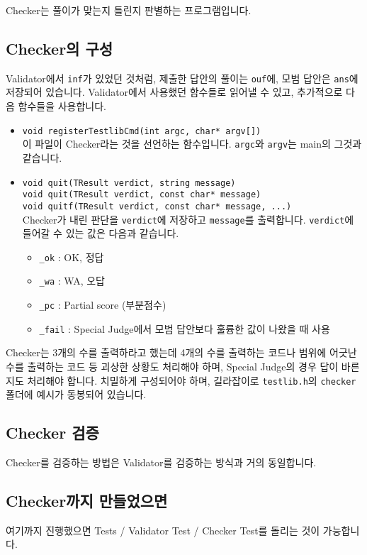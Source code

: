 \documentclass{article}
\begin{document}
    Checker는 풀이가 맞는지 틀린지 판별하는 프로그램입니다.
    \subsection{Checker의 구성}
    Validator에서 \verb|inf|가 있었던 것처럼, 제출한 답안의 풀이는 \verb|ouf|에, 모범 답안은 \verb|ans|에 저장되어 있습니다. Validator에서 사용했던 함수들로 읽어낼 수 있고, 추가적으로 다음 함수들을 사용합니다.
    \begin{itemize}
        \item \verb|void registerTestlibCmd(int argc, char* argv[])|\\
        이 파일이 Checker라는 것을 선언하는 함수입니다. \verb|argc|와 \verb|argv|는 main의 그것과 같습니다.
        \item \verb|void quit(TResult verdict, string message)|\\
        \verb|void quit(TResult verdict, const char* message)|\\
        \verb|void quitf(TResult verdict, const char* message, ...)|\\
        Checker가 내린 판단을 \verb|verdict|에 저장하고 \verb|message|를 출력합니다. \verb|verdict|에 들어갈 수 있는 값은 다음과 같습니다.
        \begin{itemize}
            \item \verb|_ok| : OK, 정답
            \item \verb|_wa| : WA, 오답
            \item \verb|_pc| : Partial score (부분점수)
            \item \verb|_fail| : Special Judge에서 모범 답안보다 훌륭한 값이 나왔을 때 사용
        \end{itemize}
    \end{itemize}
    Checker는 3개의 수를 출력하라고 했는데 4개의 수를 출력하는 코드나 범위에 어긋난 수를 출력하는 코드 등 괴상한 상황도 처리해야 하며, Special Judge의 경우 답이 바른지도 처리해야 합니다. 치밀하게 구성되어야 하며, 길라잡이로 \verb|testlib.h|의 \verb|checker| 폴더에 예시가 동봉되어 있습니다.
    \subsection{Checker 검증}
    Checker를 검증하는 방법은 Validator를 검증하는 방식과 거의 동일합니다.
    \subsection{Checker까지 만들었으면}
    여기까지 진행했으면 Tests / Validator Test / Checker Test를 돌리는 것이 가능합니다.
\end{document}
